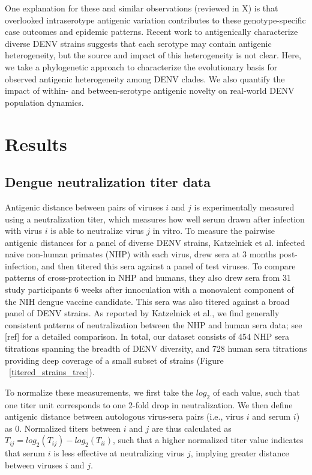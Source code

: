 \documentclass[11pt,oneside,letterpaper]{article}
\begin{document}
One explanation for these and similar observations (reviewed in X) is that overlooked intraserotype antigenic variation contributes to these genotype-specific case outcomes and epidemic patterns.
Recent work to antigenically characterize diverse DENV strains suggests that each serotype may contain antigenic heterogeneity, but the source and impact of this heterogeneity is not clear.
Here, we take a phylogenetic approach to characterize the evolutionary basis for observed antigenic heterogeneity among DENV clades.
We also quantify the impact of within- and between-serotype antigenic novelty on real-world DENV population dynamics.

\section*{Results}


\subsection{Dengue neutralization titer data}

Antigenic distance between pairs of viruses $i$ and $j$ is experimentally measured using a neutralization titer, which measures how well serum drawn after infection with virus $i$ is able to neutralize virus $j$ in vitro.
To measure the pairwise antigenic distances for a panel of diverse DENV strains, Katzelnick et al. infected naive non-human primates (NHP) with each virus, drew sera at 3 months post-infection, and then titered this sera against a panel of test viruses.
To compare patterns of cross-protection in NHP and humans, they also drew sera from 31 study participants 6 weeks after innoculation with a monovalent component of the NIH dengue vaccine candidate.
This sera was also titered against a broad panel of DENV strains.
As reported by Katzelnick et al., we find generally consistent patterns of neutralization between the NHP and human sera data; see [ref] for a detailed comparison.
In total, our dataset consists of 454 NHP sera titrations spanning the breadth of DENV diversity, and 728 human sera titrations providing deep coverage of a small subset of strains (Figure ~\ref{titered_strains_tree}).

To normalize these measurements, we first take the $log_2$ of each value, such that one titer unit corresponds to one 2-fold drop in neutralization.
We then define antigenic distance between autologous virus-sera pairs (i.e., virus $i$ and serum $i$) as 0.
Normalized titers between $i$ and $j$ are thus calculated as $T_{ij} = log_2(T_{ij}) - log_2(T_{ii})$, such that a higher normalized titer value indicates that serum $i$ is less effective at neutralizing virus $j$, implying greater distance between viruses $i$ and $j$.
\end{document}

